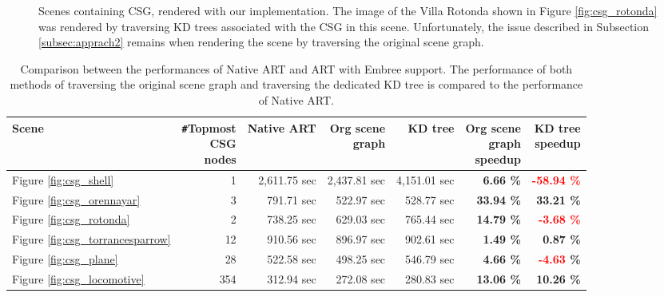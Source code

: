 \begin{figure}
	\hfill
	
	\caption{Scenes containing CSG, rendered with our implementation. The image of the Villa Rotonda shown in Figure \ref{fig:csg_rotonda} was rendered by traversing KD trees associated with the CSG in this scene. Unfortunately, the issue described in Subsection \ref{subsec:apprach2} remains when rendering the scene by traversing the original scene graph.}
	\label{fig:csg_figures}
\end{figure}

\begin{table}[h]
	\centering
	{\footnotesize\sf
		\begin{tabular}{lrrrrrr}
			\toprule
			Scene & \thead{\texttt{\#}Topmost \\ CSG \\ nodes} & Native ART & \thead{Org scene \\ graph} &  KD tree & \thead{Org scene \\ graph \\ speedup} & \thead{KD tree \\ speedup} \\ 
			\midrule
			Figure \ref{fig:csg_shell} & 1 & 2,611.75 sec & 2,437.81 sec & 4,151.01 sec & \textbf{6.66 \%} & \textbf{\textcolor{red}{-58.94 \%}}  \\
			Figure \ref{fig:csg_orennayar} & 3 & 791.71 sec & 522.97 sec & 528.77 sec & \textbf{33.94 \%} & \textbf{33.21 \%} \\
			Figure \ref{fig:csg_rotonda} & 2 & 738.25 sec & 629.03 sec &  765.44 sec & \textbf{14.79 \%}  & \textbf{\textcolor{red}{-3.68 \%}}  \\
			\addlinespace %
			Figure \ref{fig:csg_torrancesparrow} & 12 & 910.56 sec & 896.97 sec & 902.61 sec & \textbf{1.49 \%}  & \textbf{0.87 \%} \\
			Figure \ref{fig:csg_plane} & 28 & 522.58 sec & 498.25 sec & 546.79 sec & \textbf{4.66 \%} & \textbf{\textcolor{red}{-4.63} \%} \\
			Figure \ref{fig:csg_locomotive} & 354 & 312.94 sec & 272.08 sec & 280.83 sec & \textbf{13.06 \%}  & \textbf{10.26 \%} \\
			\bottomrule
	\end{tabular}}
	\caption{Comparison between the performances of Native ART and ART with Embree support. The performance of both methods of traversing the original scene graph and traversing the dedicated KD tree is compared to the performance of Native ART.}
	\label{tab:csg}
\end{table}

